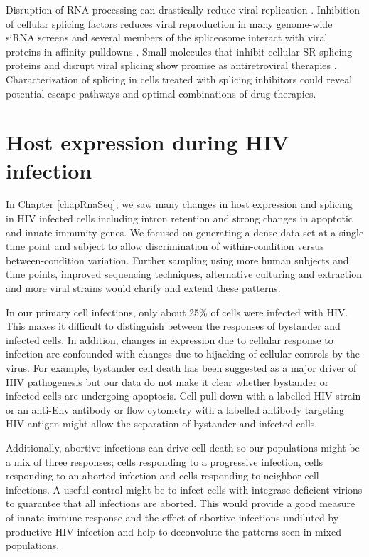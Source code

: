 \documentclass[../sherrill-Mix_thesis.tex]{subfiles}
\begin{document}
	Disruption of RNA processing can drastically reduce viral replication \citep{Wentz1997,Caputi2004,Madsen2005,Paca-Uccaralertkun2006,Mandal2008}. Inhibition of cellular splicing factors reduces viral reproduction in many genome-wide siRNA screens \citep{Brass2008,Konig2008,Bushman2009} and several members of the spliceosome interact with viral proteins in affinity pulldowns \citep{Jager2012}. Small molecules that inhibit cellular SR splicing proteins and disrupt viral splicing show promise as antiretroviral therapies \citep{Fukuhara2006,Bakkour2007,Wong2011,Wong2013}. Characterization of splicing in cells treated with splicing inhibitors could reveal potential escape pathways and optimal combinations of drug therapies.


\section{Host expression during HIV infection} 
	In Chapter \ref{chapRnaSeq}, we saw many changes in host expression and splicing in HIV infected cells including intron retention and strong changes in apoptotic and innate immunity genes. We focused on generating a dense data set at a single time point and subject to allow discrimination of within-condition versus between-condition variation. Further sampling using more human subjects and time points, improved sequencing techniques, alternative culturing and extraction and more viral strains would clarify and extend these patterns.

	In our primary cell infections, only about 25\% of cells were infected with HIV. This makes it difficult to distinguish between the responses of bystander and infected cells. In addition, changes in expression due to cellular response to infection are confounded with changes due to hijacking of cellular controls by the virus. For example, bystander cell death has been suggested as a major driver of HIV pathogenesis \citep{Finkel1995,Doitsh2014} but our data do not make it clear whether bystander or infected cells are undergoing apoptosis. Cell pull-down with a labelled HIV strain \citep{Imbeault2009} or an anti-Env antibody \citep{Bahbouhi2004} or flow cytometry with a labelled antibody targeting HIV antigen \citep{Pace2012,Hrvatin2014} might allow the separation of bystander and infected cells. 

	Additionally, abortive infections can drive cell death \citep{Monroe2014,Doitsh2014} so our populations might be a mix of three responses; cells responding to a progressive infection, cells responding to an aborted infection and cells responding to neighbor cell infections. A useful control might be to infect cells with integrase-deficient virions to guarantee that all infections are aborted. This would provide a good measure of innate immune response and the effect of abortive infections undiluted by productive HIV infection and help to deconvolute the patterns seen in mixed populations.
\end{document}
